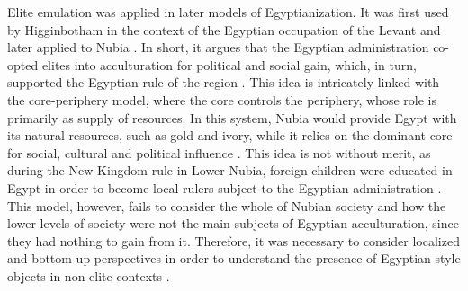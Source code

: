 Elite emulation was applied in later models of Egyptianization. It was first used by Higginbotham in the context of the Egyptian occupation of the Levant and later applied to Nubia \parencites{higginbothamEgyptianizationEliteEmulation2000}. In short, it argues that the Egyptian administration co-opted elites into acculturation for political and social gain, which, in turn, supported the Egyptian rule of the region \parencites[p.~277-278]{smithNubiaEgyptInteraction1998}[p.~274]{törökTwoWorldsFrontier2009}. This idea is intricately linked with the core-periphery model, where the core controls the periphery, whose role is primarily as supply of resources. In this system, Nubia would provide Egypt with its natural resources, such as gold and ivory, while it relies on the dominant core for social, cultural and political influence \parencites{smithNubiaEgyptInteraction1998, flamminiAncientCorePeripheryInteractions2008}. This idea is not without merit, as during the New Kingdom rule in Lower Nubia, foreign children were educated in Egypt in order to become local rulers subject to the Egyptian administration \parencites[p.~530]{vanpeltRevisingEgyptoNubianRelations2013}[p.~223]{morrisAncientEgyptianImperialism2018}. This model, however, fails to consider the whole of Nubian society and how the lower levels of society were not the main subjects of Egyptian acculturation, since they had nothing to gain from it. Therefore, it was necessary to consider localized and bottom-up perspectives in order to understand the presence of Egyptian-style objects in non-elite contexts \parencites[p.~530]{vanpeltRevisingEgyptoNubianRelations2013}.


